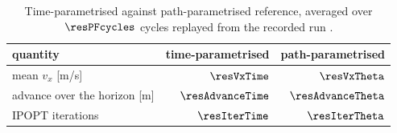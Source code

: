 \begin{table}[htbp]
  \centering
  \small
  \caption{Time-parametrised against path-parametrised reference, averaged over $\resPFcycles$ cycles replayed from the recorded run \resBag.}
  \label{res:tab:pf}
  \begin{tabular}{lrr}
    \toprule
    quantity & time-parametrised & path-parametrised \\
    \midrule
    mean $v_x$ [m/s] & $\resVxTime$ & $\resVxTheta$ \\
    advance over the horizon [m] & $\resAdvanceTime$ & $\resAdvanceTheta$ \\
    IPOPT iterations & $\resIterTime$ & $\resIterTheta$ \\
    \bottomrule
  \end{tabular}
\end{table}

